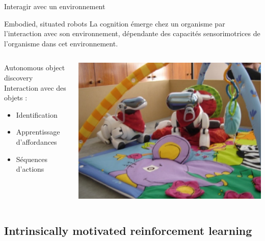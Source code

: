\documentclass[xcolor=pst,dvips,12pt,english,french]{beamer}
\begin{document}
	\begin{frame}{Interagir avec un environnement}
		\begin{block}{Embodied, situated robots}
			La cognition émerge chez un organisme par l'interaction avec son environnement, dépendante des capacités sensorimotrices de l'organisme dans cet environnement.
		\end{block}
		\begin{columns}
			\begin{column}{0.55\textwidth}
				\begin{exampleblock}{Autonomous object discovery}
					Interaction avec des objets : 
					\begin{itemize}
						\item Identification
						\item Apprentissage d'affordances
						\item Séquences d'actions
					\end{itemize}
				\end{exampleblock}
			\end{column}
			\begin{column}{0.35\textwidth}
				\vspace{0.5cm}
				\centering
				\includegraphics[width=\textwidth]{images/playground.eps}
			\end{column}
		\end{columns}
	\end{frame}
	
	\subsection{Intrinsically motivated reinforcement learning}
	
\end{document}
